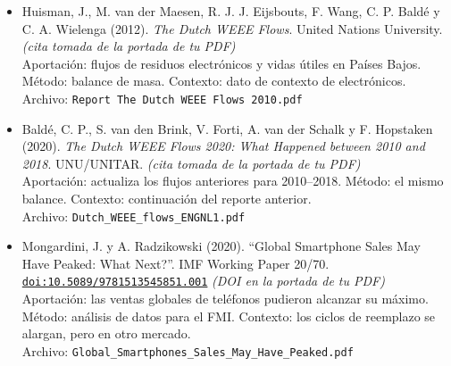 \documentclass[11pt]{article}
\begin{document}
\begin{itemize}
Aportación: la responsabilidad individual del productor no incentiva el diseño para reciclaje. Método: columna de opinión. Contexto: lateral, solo para discusión.\\
{\footnotesize Archivo: \texttt{Too big to fail.pdf}}
\item Huisman, J., M. van der Maesen, R. J. J. Eijsbouts, F. Wang, C. P. Baldé y C. A. Wielenga (2012). \textit{The Dutch WEEE Flows}. United Nations University. \textit{(cita tomada de la portada de tu PDF)}\\
Aportación: flujos de residuos electrónicos y vidas útiles en Países Bajos. Método: balance de masa. Contexto: dato de contexto de electrónicos.\\
{\footnotesize Archivo: \texttt{Report The Dutch WEEE Flows 2010.pdf}}
\item Baldé, C. P., S. van den Brink, V. Forti, A. van der Schalk y F. Hopstaken (2020). \textit{The Dutch WEEE Flows 2020: What Happened between 2010 and 2018}. UNU/UNITAR. \textit{(cita tomada de la portada de tu PDF)}\\
Aportación: actualiza los flujos anteriores para 2010--2018. Método: el mismo balance. Contexto: continuación del reporte anterior.\\
{\footnotesize Archivo: \texttt{Dutch\_WEEE\_flows\_ENGNL1.pdf}}
\item Mongardini, J. y A. Radzikowski (2020). ``Global Smartphone Sales May Have Peaked: What Next?''. IMF Working Paper 20/70. \href{https://doi.org/10.5089/9781513545851.001}{\texttt{doi:10.5089/9781513545851.001}} \textit{(DOI en la portada de tu PDF)}\\
Aportación: las ventas globales de teléfonos pudieron alcanzar su máximo. Método: análisis de datos para el FMI. Contexto: los ciclos de reemplazo se alargan, pero en otro mercado.\\
{\footnotesize Archivo: \texttt{Global\_Smartphones\_Sales\_May\_Have\_Peaked.pdf}}
\end{itemize}
\end{document}
